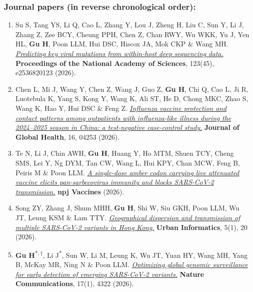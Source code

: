 \documentclass[letterpaper,10pt]{article}
\newcommand{\yr}[1]{\makebox[0pt][l]{\hspace{\linewidth}\hspace{5pt}\small\bfseries #1}\ignorespaces}
\newcommand{\journal}[1]{\textbf{#1}}
\newcounter{firstauthorcount}
\newcommand{\faitem}{\refstepcounter{firstauthorcount}\item}
\newcounter{correspondingauthorcount}
\begin{document}
\subsubsection*{Journal papers \textmd{(in reverse chronological order)}:}
\begin{enumerate}[itemsep=0.5pt, parsep=0pt]
      \item \yr{2026}Su S, Tang YS, Li Q, Cao L, Zhang Y, Lou J, Zheng H, Liu C, Sun Y, Li J, Zhang Z, Zee BCY, Cheung PPH, Chen Z, Chan RWY, Wu WKK, Yu J, Yen HL, \textbf{Gu H}, Poon LLM, Hui DSC, Hiscox JA, Mok CKP \& Wang MH. \href{https://doi.org/10.1073/pnas.2536820123}{\textit{Predicting key viral mutations from within-host deep sequencing data.}} \journal{Proceedings of the National Academy of Sciences}, 123(45), e2536820123 (2026).
      \let\cvpublicationitem\item
      \renewcommand{\item}{\cvpublicationitem}
      \item Chen L, Mi J, Wang Y, Chen Z, Wang J, Guo Z, \textbf{Gu H}, Chi Q, Cao L, Ji R, Luotebula K, Yang S, Kong Y, Wang K, Ali ST, He D, Chong MKC, Zhao S, Wang K, Hao Y, Hui DSC \& Feng Z. \href{https://doi.org/10.7189/jogh.16.04253}{\textit{Influenza vaccine protection and contact patterns among outpatients with influenza-like illness during the 2024--2025 season in China: a test-negative case-control study.}} \journal{Journal of Global Health}, 16, 04253 (2026).
      \item Te N, Li J, Chin AWH, \textbf{Gu H}, Huang Y, Ho MTM, Shuen TCY, Cheng SMS, Lei Y, Ng DYM, Tan CW, Wang L, Hui KPY, Chan MCW, Feng B, Peiris M \& Poon LLM. \href{https://doi.org/10.1038/s41541-026-01540-7}{\textit{A single-dose amber codon carrying live attenuated vaccine elicits pan-sarbecovirus immunity and blocks SARS-CoV-2 transmission.}} \journal{npj Vaccines} (2026).
      \item Song ZY, Zhang J, Shum MHH, \textbf{Gu H}, Shi W, Siu GKH, Poon LLM, Wu JT, Leung KSM \& Lam TTY. \href{https://doi.org/10.1007/s44212-026-00108-z}{\textit{Geographical dispersion and transmission of multiple SARS-CoV-2 variants in Hong Kong.}} \journal{Urban Informatics}, 5(1), 20 (2026).
      \faitem {}\textbf{Gu H}\textsuperscript{$*,\dagger$}, Li J\textsuperscript{$*$}, Sun W, Li M, Leung K, Wu JT, Yuan HY, Wang MH, Yang B, McKay MR, Ning N \& Poon LLM. \href{https://doi.org/10.1038/s41467-026-70664-0}{\textit{Optimizing global genomic surveillance for early detection of emerging SARS-CoV-2 variants.}} \journal{Nature Communications}, 17(1), 4322 (2026).

\end{enumerate}
\end{document}
